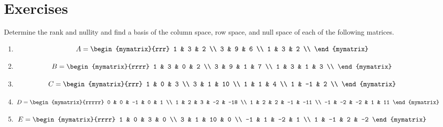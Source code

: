 \section*{Exercises}

\begin{ex}
  Determine the rank and nullity and find a basis of the column
  space, row space, and null space of each of the following matrices.
  \begin{enumerate}
  \item
    \begin{equation*}
      A = \begin{mymatrix}{rrr}
        1 & 3 & 2 \\
        3 & 9 & 6 \\
        1 & 3 & 2 \\
      \end{mymatrix}
    \end{equation*}
  \item
    \begin{equation*}
      B = \begin{mymatrix}{rrrr}
        1 & 3 & 0 & 2 \\
        3 & 9 & 1 & 7 \\
        1 & 3 & 1 & 3 \\
      \end{mymatrix}
    \end{equation*}
  \item
    \begin{equation*}
      C = \begin{mymatrix}{rrr}
        1 & 0 & 3 \\
        3 & 1 & 10 \\
        1 & 1 & 4 \\
        1 & -1 & 2 \\
      \end{mymatrix}
    \end{equation*}
  \item
    \begin{equation*}
      D = \begin{mymatrix}{rrrrr}
        0 & 0 & -1 & 0 & 1 \\
        1 & 2 & 3 & -2 & -18 \\
        1 & 2 & 2 & -1 & -11 \\
        -1 & -2 & -2 & 1 & 11
      \end{mymatrix}
    \end{equation*}
  \item
    \begin{equation*}
      E = \begin{mymatrix}{rrrr}
        1 & 0 & 3 & 0 \\
        3 & 1 & 10 & 0 \\
        -1 & 1 & -2 & 1 \\
        1 & -1 & 2 & -2
      \end{mymatrix}
    \end{equation*}
  \end{enumerate}
\end{ex}


